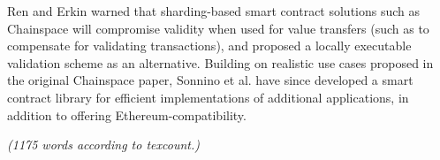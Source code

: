 \documentclass[11pt]{article}
\begin{document}
Ren and Erkin \cite{ren2018scale} warned that sharding-based smart contract solutions such as Chainspace \cite{al2017chainspace} will compromise validity when used for value transfers (such as to compensate for validating transactions), and proposed a locally executable validation scheme as an alternative. Building on realistic use cases proposed in the original Chainspace paper, Sonnino et al. have since developed a smart contract library \cite{sonnino2018coconut} for efficient implementations of additional applications, in addition to offering Ethereum-compatibility. 

\emph{(1175 words according to texcount.)}


\footnotesize{}
\end{document}
